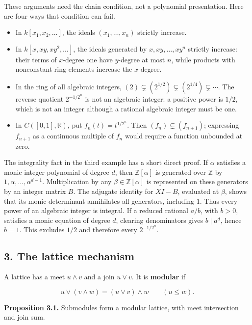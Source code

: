 \documentclass[
]{article}
\providecommand{\tightlist}{%
  \setlength{\itemsep}{0pt}\setlength{\parskip}{0pt}}
\begin{document}
These arguments need the chain condition, not a polynomial presentation.
Here are four ways that condition can fail.

\begin{itemize}
\tightlist
\item
  In \(k[x_1,x_2,\ldots]\), the ideals \((x_1,\ldots,x_n)\) strictly
  increase.
\item
  In \(k[x,xy,xy^2,\ldots]\), the ideals generated by
  \(x,xy,\ldots,xy^n\) strictly increase: their terms of \(x\)-degree
  one have \(y\)-degree at most \(n\), while products with nonconstant
  ring elements increase the \(x\)-degree.
\item
  In the ring of all algebraic integers,
  \((2)\subsetneq(2^{1/2})\subsetneq(2^{1/4})\subsetneq\cdots\). The
  reverse quotient \(2^{-1/2^n}\) is not an algebraic integer: a
  positive power is \(1/2\), which is not an integer although a rational
  algebraic integer must be one.
\item
  In \(C([0,1],\mathbb R)\), put \(f_n(t)=t^{1/2^n}\). Then
  \((f_n)\subsetneq(f_{n+1})\); expressing \(f_{n+1}\) as a continuous
  multiple of \(f_n\) would require a function unbounded at zero.
\end{itemize}

The integrality fact in the third example has a short direct proof. If
\(\alpha\) satisfies a monic integer polynomial of degree \(d\), then
\(\mathbb Z[\alpha]\) is generated over \(\mathbb Z\) by
\(1,\alpha,\ldots,\alpha^{d-1}\). Multiplication by any
\(\beta\in\mathbb Z[\alpha]\) is represented on these generators by an
integer matrix \(B\). The adjugate identity for \(XI-B\), evaluated at
\(\beta\), shows that its monic determinant annihilates all generators,
including \(1\). Thus every power of an algebraic integer is integral.
If a reduced rational \(a/b\), with \(b>0\), satisfies a monic equation
of degree \(d\), clearing denominators gives \(b\mid a^d\), hence
\(b=1\). This excludes \(1/2\) and therefore every \(2^{-1/2^n}\).

\subsection{3. The lattice mechanism}\label{the-lattice-mechanism}

A lattice has a meet \(u\wedge v\) and a join \(u\vee v\). It is
\textbf{modular} if

\[
u\vee(v\wedge w)=(u\vee v)\wedge w\qquad(u\leq w).
\]

\textbf{Proposition 3.1.} Submodules form a modular lattice, with meet
intersection and join sum.
\end{document}
